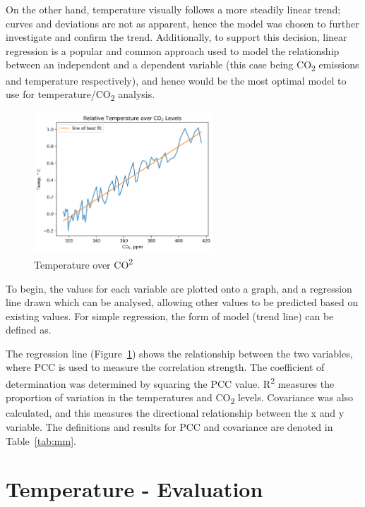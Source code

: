 \documentclass[12pt]{mcmthesis}
\begin{document}
    On the other hand, temperature visually follows a more steadily linear trend; curves and deviations are not as apparent, hence the model was chosen to further investigate and confirm the trend. Additionally, to support this decision, linear regression is a popular and common approach used to model the relationship between an independent and a dependent variable (this case being CO\textsubscript{2} emissions and temperature respectively), and hence would be the most optimal model to use for temperature/CO\textsubscript{2} analysis.

    \begin{figure}
        \centering
        \includegraphics[width=0.6\textwidth]{ct2}
        \caption{Temperature over CO\textsuperscript{2}}
        \label{fig:ct}
    \end{figure}

    To begin, the values for each variable are plotted onto a graph, and a regression line drawn which can be analysed, allowing other values to be predicted based on existing values. For simple regression, the form of model (trend line) can be defined as.

    The regression line (Figure~\ref{fig:ct}) shows the relationship between the two variables, where PCC is used to measure the correlation strength. The coefficient of determination was determined by squaring the PCC value. R\textsuperscript{2} measures the proportion of variation in the temperatures and CO\textsubscript{2} levels. Covariance was also calculated, and this measures the directional relationship between the x and y variable. The definitions and results for PCC and covariance are denoted in Table~\ref{tab:mm}.



    \section{Temperature - Evaluation}
\end{document}
